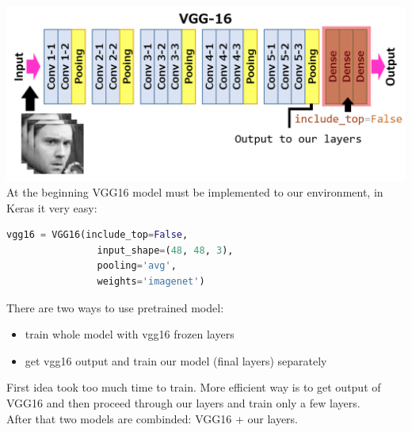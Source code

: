 \includegraphics[scale=0.5]{images/modelOne/vgg16layers.png}
At the beginning VGG16 model must be implemented to our environment, in Keras it very easy:
\begin{lstlisting}[language=Python]
    vgg16 = VGG16(include_top=False,
                input_shape=(48, 48, 3),
                pooling='avg',
                weights='imagenet')
\end{lstlisting}

There are two ways to use pretrained model:
\begin{itemize}
          \item train whole model with vgg16 frozen layers
          \item get vgg16 output and train our model (final layers) separately
\end{itemize}
First idea took too much time to train.
More efficient way is to get output of VGG16 and then proceed through our layers and train only a few layers.\\
After that two models are combinded: VGG16 + our layers.


